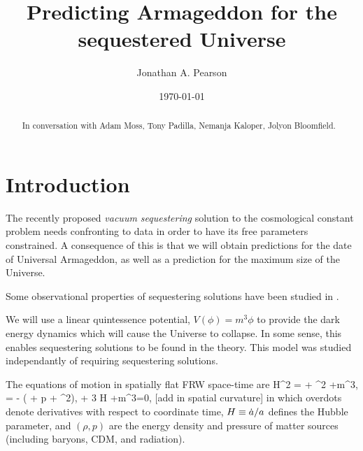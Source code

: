 \documentclass[amsmath,amssymb,10pt,twocolumn,eqsecnum]{revtex4}
\newcommand{\comment}[1]{{\color{red}[#1]}}
\newcommand{\Mpsq}[0]{{\qsubrm{M}{pl}^2}}
\begin{document}
 

\title{Predicting Armageddon for the sequestered Universe}
\author{Jonathan A. Pearson}

\date{\today}


\begin{abstract} 
In conversation with Adam Moss, Tony Padilla, Nemanja Kaloper, Jolyon Bloomfield.

\end{abstract}

\maketitle
\section{Introduction}
The recently proposed \textit{vacuum sequestering} solution to the cosmological constant problem \cite{Kaloper:2013zca, Kaloper:2014dqa, Kaloper:2014fca} needs confronting to data in order to have its free parameters constrained. A consequence of this is that we will obtain predictions for the date of  Universal Armageddon, as well as a prediction for the maximum size of the Universe.

Some observational properties of sequestering solutions have been studied in \cite{Avelino:2014nqa, Avelino:2014aea, Kluson:2014tma}.

We will use a linear quintessence potential, $V(\phi) =  {m}^3\phi$ to provide the dark energy dynamics which will cause the Universe to collapse. In some sense, this enables sequestering solutions to be found in the theory. This model was studied \cite{Kallosh:2003bq} independantly of requiring sequestering solutions.

The equations of motion in spatially flat FRW space-time  are
\bse
\label{frw-eqnsofmotion}
\bea
3\Mpsq H^2 =  {\rho}{ } + \half \dot{\phi}^2 +m^3\phi,
\eea
\bea
3\Mpsq {} = - \left(  {\rho}{ } +  {p}{ } + \dot{\phi}^2\right),
\eea
\bea
\ddot{\phi} + 3 H \dot{\phi} +m^3=0,
\eea
\ese
\comment{add in spatial curvature}
in which overdots denote derivatives with respect to coordinate time, $H \equiv \dot{a}/a$ defines the Hubble parameter, and $(\rho, p)$ are the energy density and pressure of matter sources (including baryons, CDM, and radiation).
\end{document}

